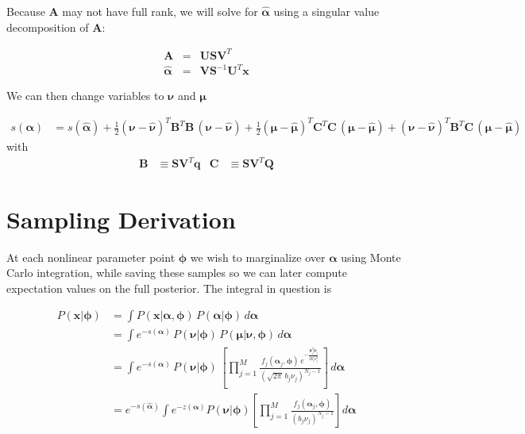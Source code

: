 \documentclass{amsart}
\newcommand{\bm}[1]{\ensuremath{\boldsymbol{#1}}}
\begin{document}
Because $\bm{A}$ may not have full rank, we will solve for
$\hat{\bm{\alpha}}$ using a singular value
decomposition of $\bm{A}$:

\begin{eqnarray}
  \bm{A} &=& \bm{U} \bm{S} \bm{V}^T \\
  \hat{\bm{\alpha}} &=& \bm{V} \bm{S}^{-1} \bm{U}^T
  \bm{x}
\end{eqnarray}

We can then change variables to $\bm{\nu}$ and $\bm{\mu}$

\begin{align}
  s(\bm{\alpha}) &= s(\hat{\bm{\alpha}}) +
  \frac{1}{2}(\bm{\nu}-\hat{\bm{\nu}})^T\bm{B}^T\!\bm{B}\,(\bm{\nu}-\hat{\bm{\nu}})
  + \frac{1}{2}(\bm{\mu}-\hat{\bm{\mu}})^T\bm{C}^T\!\bm{C}\,(\bm{\mu}-\hat{\bm{\mu}})
  + (\bm{\nu}-\hat{\bm{\nu}})^T\bm{B}^T\!\bm{C}\,(\bm{\mu}-\hat{\bm{\mu}})
\end{align}
with
\begin{align}
  \bm{B} &\equiv \bm{S}\bm{V}^T\!\bm{q} & 
  \bm{C} &\equiv \bm{S}\bm{V}^T\!\bm{Q}
\end{align}

\section{Sampling Derivation}

At each nonlinear parameter point $\bm{\phi}$ we wish to marginalize
over $\bm{\alpha}$ using Monte Carlo integration, while saving these
samples so we can later compute expectation values on the full
posterior.  The integral in question is

\begin{align}
  P(\bm{x}|\bm{\phi}) &= \int P(\bm{x}|\bm{\alpha},\bm{\phi})
  \,P(\bm{\alpha}|\bm{\phi})\,d\bm{\alpha} \\
  &= \int e^{-s(\bm{\alpha})}\,
  P(\bm{\nu}|\bm{\phi})\,
  P(\bm{\mu}|\bm{\nu},\bm{\phi})\,d\bm{\alpha} \\
  &= \int e^{-s(\bm{\alpha})}\,
  P(\bm{\nu}|\bm{\phi})\,
  \left[
    \prod_{j=1}^M \frac{f_j(\bm{\alpha}_j,\bm{\phi})\,e^{-\frac{\bm{\mu}_j^T\!\bm{\mu}_j}{2b_j^2\nu_j^2}}}
         {\left(\sqrt{2\pi}\,b_j\nu_j\right)^{{N_j-1}}}
    \right]\,d\bm{\alpha} \\
  &= e^{-s(\hat{\bm{\alpha}})}\int e^{-z(\bm{\alpha})}
  P(\bm{\nu}|\bm{\phi})\left[
    \prod_{j=1}^M \frac{f_j(\bm{\alpha}_j,\bm{\phi})}
         {\left(b_j\nu_j\right)^{N_j-1}}
    \right]d\bm{\alpha}
  \label{eqn:marginalization}
\end{align}
\end{document}
